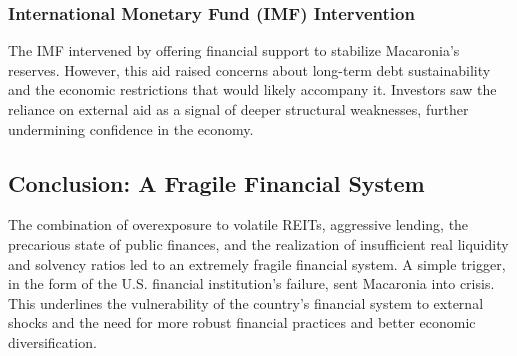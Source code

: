 \subsubsection{International Monetary Fund (IMF) Intervention}
The IMF intervened by offering financial support to stabilize Macaronia's reserves. However, this aid raised concerns about long-term debt sustainability and the economic restrictions that would likely accompany it. Investors saw the reliance on external aid as a signal of deeper structural weaknesses, further undermining confidence in the economy.

\subsection{Conclusion: A Fragile Financial System}

The combination of overexposure to volatile REITs, aggressive lending, the precarious state of public finances, and the realization of insufficient real liquidity and solvency ratios led to an extremely fragile financial system. A simple trigger, in the form of the U.S. financial institution's failure, sent Macaronia into crisis. This underlines the vulnerability of the country’s financial system to external shocks and the need for more robust financial practices and better economic diversification.
